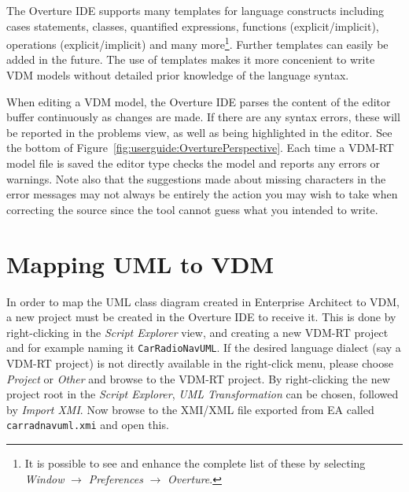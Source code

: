 The Overture IDE supports many templates for language constructs
including cases statements, classes, quantified expressions, functions
(explicit/implicit), operations (explicit/implicit) and many
more\footnote{It is possible to see and enhance the complete list of
  these by selecting \emph{Window} $\rightarrow$ \emph{Preferences}
  $\rightarrow$ \emph{Overture}.}. Further templates can easily be added in the future. The use of
templates makes it more concenient to write VDM models without
detailed prior knowledge of the language syntax.

When editing a VDM model, the Overture IDE parses the content of the
editor buffer continuously as changes are made. If there are any
syntax errors, these will be reported in the problems view, as well as
being highlighted in the editor. See the bottom of
Figure~\ref{fig:userguide:OverturePerspective}. Each time a
VDM-RT model file is saved the editor type checks the model and reports
any errors or warnings. Note also that the suggestions made about
missing characters in the
error messages may not always be entirely the action you may wish to
take when correcting the source since the tool cannot guess what you
intended to write.




\section{Mapping UML to  VDM}\label{sec:fromUMLtoVDM}\label{sec:syntaxcheck}
\label{sec:typecheck}

In order to map the UML class diagram created in Enterprise Architect
to VDM, a new project must be created in the Overture IDE to receive
it. This is done by right-clicking in the \emph{Script Explorer} view,
and creating a new VDM-RT project and for example naming it
\texttt{CarRadioNavUML}. If the desired language dialect (say a VDM-RT 
project) is not directly available in the right-click menu, please choose
\emph{Project} or 
\emph{Other} and browse to the VDM-RT project. By right-clicking the new 
project root in the \emph{Script Explorer}, \emph{UML Transformation} can 
be chosen, followed by \emph{Import XMI}. Now browse to the XMI/XML file
exported from EA called \texttt{carradnavuml.xmi} and open this.

